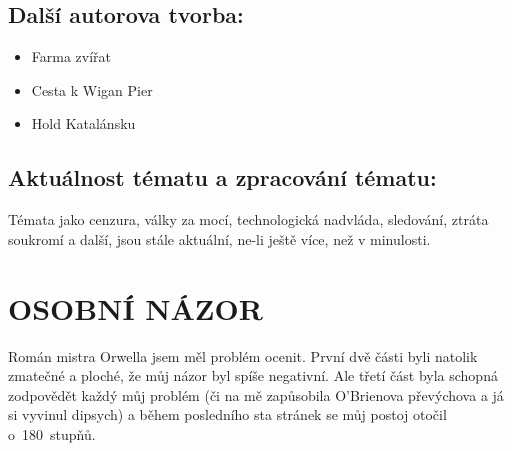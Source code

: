 \documentclass{extarticle} %
\begin{document}

\subsection*{Další autorova tvorba:}
\noindent 
\begin{itemize}
    \item Farma zvířat
    \item Cesta k Wigan Pier
    \item Hold Katalánsku
\end{itemize}




\subsection*{Aktuálnost tématu a zpracování tématu:}
\noindent
Témata jako cenzura, války za mocí, technologická nadvláda, sledování, ztráta soukromí a další, jsou stále aktuální, ne-li ještě více, než v minulosti.


\section*{OSOBNÍ NÁZOR}
\noindent 
Román mistra Orwella jsem měl problém ocenit. První dvě části byli natolik zmatečné a ploché, že můj názor byl spíše negativní. Ale třetí část byla schopná zodpovědět každý můj problém (či na mě zapůsobila O’Brienova převýchova a já si vyvinul dipsych) a během posledního sta stránek se můj postoj otočil o~180~stupňů.



\vfill
\end{document}
